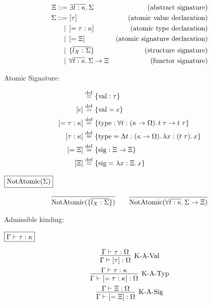 \begin{align*}
  \Xi
  &\BNFassign \exists \overline{t: \kappa}\ldotp \Sigma &(\text{abstract signature}) \\
  \Sigma
  &\BNFassign [\tau] &(\text{atomic value declaration}) \\
  &\BNFor [= \tau: \kappa] &(\text{atomic type declaration}) \\
  &\BNFor [= \Xi] &(\text{atomic signature declaration}) \\
  &\BNFor \{\overline{l_X: \Sigma}\} &(\text{structure signature}) \\
  &\BNFor \forall \overline{t: \kappa}\ldotp \Sigma \to \Xi &(\text{functor signature})
\end{align*}

Atomic Signature:

\begin{align*}
  [\tau] &\defrel{=} \{\symval: \tau\} \\
  [e] &\defrel{=} \{\symval = e\} \\
  [= \tau: \kappa] &\defrel{=} \{\symtype: \forall t: (\kappa \to \Omega)\ldotp t\; \tau \to t\; \tau\} \\
  [\tau: \kappa] &\defrel{=} \{\symtype = \Lambda t: (\kappa \to \Omega)\ldotp \lambda x: (t\; \tau)\ldotp x\} \\
  [= \Xi] &\defrel{=} \{\symsig: \Xi \to \Xi\} \\
  [\Xi] &\defrel{=} \{\symsig = \lambda x: \Xi\ldotp x\}
\end{align*}

\newcommand*{\symNotAtomic}{\mathop{\mathrm{NotAtomic}}}

$\fbox{$\symNotAtomic(\Sigma)$}$

\begin{gather*}
  \infer{\symNotAtomic(\{\overline{l_X: \Sigma}\})}{}
  \hspace{2em}
  \infer{\symNotAtomic(\forall \overline{t: \kappa}\ldotp \Sigma \to \Xi)}{}
\end{gather*}

Admissible kinding:

$\fbox{$\Gamma \vdash \tau: \kappa$}$

\begin{gather*}
  \infer[\text{K-A-Val}]{\Gamma \vdash [\tau]: \Omega}{
    \Gamma \vdash \tau: \Omega
  }
  \\
  \infer[\text{K-A-Typ}]{\Gamma \vdash [= \tau: \kappa]: \Omega}{
    \Gamma \vdash \tau: \kappa
  }
  \\
  \infer[\text{K-A-Sig}]{\Gamma \vdash [= \Xi]: \Omega}{
    \Gamma \vdash \Xi: \Omega
  }
\end{gather*}

